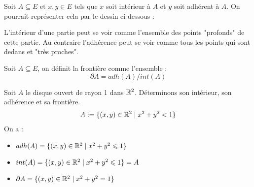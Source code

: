 \begin{remark}[Illustration]
    Soit $A \subseteq E$ et $x,y \in E$ tels que $x$ soit intérieur à $A$ et $y$ soit adhérent à $A$. 
    On pourrait représenter cela par le dessin ci-dessous :

    \begin{center}
    \end{center}

    L'intérieur d'une partie peut se voir comme l'ensemble des points "profonds" de cette partie. 
    Au contraire l'adhérence peut se voir comme tous les points qui sont dedans et "très proches". 
\end{remark}

\begin{definition}[Frontière]
    Soit $A \subseteq E$, on définit la frontière comme l'ensemble :
        \[ \partial A = adh(A) / int(A) \] 
\end{definition}

\begin{example}
    Soit $A$ le disque ouvert de rayon 1 dans $\mathbb{R}^2$. Déterminons son intérieur, son adhérence et sa frontière. 
        \[ A := \{ (x,y) \in \mathbb{R}^2 \; | \; x^2 + y^2 < 1 \} \] 
    On a : 
    \begin{itemize}
        \item $adh(A) = \{ (x,y) \in \mathbb{R}^2 \; | \; x^2 + y^2 \leqslant 1 \} $
        \item $int(A) = \{ (x,y) \in \mathbb{R}^2 \; | \; x^2 + y^2 \leqslant 1 \} = A $
        \item $\partial A = \{ (x,y) \in \mathbb{R}^2 \; | \; x^2 + y^2 = 1 \} $
    \end{itemize}
\end{example}


